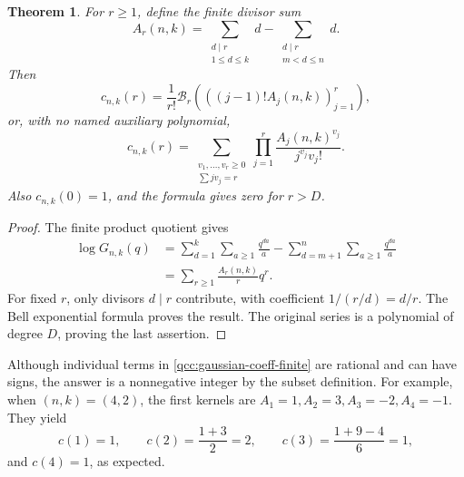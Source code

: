 \documentclass[11pt,a4paper,oneside,openany]{book}
\newtheorem{theorem}{Theorem}[chapter]
\theoremstyle{definition}
\theoremstyle{remark}
\newcommand{\Y}[1]{\mathcal B_{#1}}
\begin{document}
\begin{theorem}\label{qcc:divisor-coefficients}
For \(r\ge1\), define the finite divisor sum
\begin{equation}\label{qcc:arithmetic-kernel}
 A_r(n,k)=\sum_{\substack{d\mid r\\1\le d\le k}}d
          -\sum_{\substack{d\mid r\\m<d\le n}}d.
\end{equation}
Then
\begin{equation}\label{qcc:gaussian-coeff-bell}
 c_{n,k}(r)=\frac1{r!}\Y r\left(
        \left((j-1)!A_j(n,k)\right)_{j=1}^r\right),
\end{equation}
or, with no named auxiliary polynomial,
\begin{equation}\label{qcc:gaussian-coeff-finite}
 c_{n,k}(r)=\sum_{\substack{v_1,\ldots,v_r\ge0\\\sum jv_j=r}}
                 \prod_{j=1}^r\frac{A_j(n,k)^{v_j}}{j^{v_j}v_j!}.
\end{equation}
Also \(c_{n,k}(0)=1\), and the formula gives zero for \(r>D\).
\end{theorem}
\begin{proof}
The finite product quotient gives
\begin{align*}
 \log G_{n,k}(q)
 &=\sum_{d=1}^k\sum_{a\ge1}\frac{q^{da}}a
   -\sum_{d=m+1}^n\sum_{a\ge1}\frac{q^{da}}a\\
 &=\sum_{r\ge1}\frac{A_r(n,k)}r q^r.
\end{align*}
For fixed \(r\), only divisors \(d\mid r\) contribute, with coefficient
\(1/(r/d)=d/r\). The Bell exponential formula proves the result. The original
series is a polynomial of degree \(D\), proving the last assertion.
\end{proof}
Although individual terms in \eqref{qcc:gaussian-coeff-finite} are rational and
can have signs, the answer is a nonnegative integer by the subset definition.
For example, when \((n,k)=(4,2)\), the first kernels are
\(A_1=1,A_2=3,A_3=-2,A_4=-1\). They yield
\[
 c(1)=1,\qquad c(2)=\frac{1+3}{2}=2,\qquad
 c(3)=\frac{1+9-4}{6}=1,
\]
and \(c(4)=1\), as expected.
\end{document}
